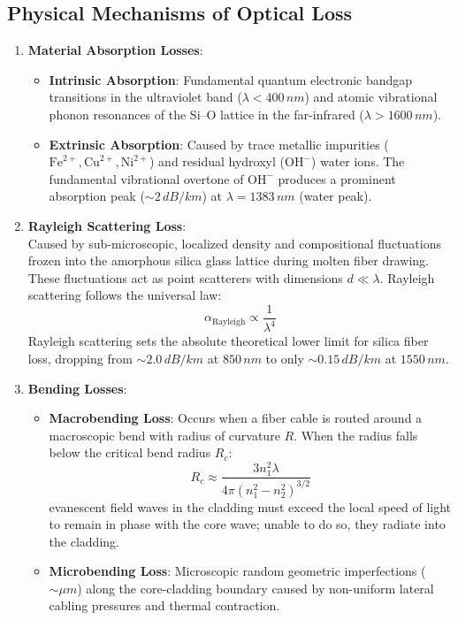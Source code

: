 \subsection{Physical Mechanisms of Optical Loss}
\begin{enumerate}
    \item \textbf{Material Absorption Losses}:
    \begin{itemize}
        \item \textbf{Intrinsic Absorption}: Fundamental quantum electronic bandgap transitions in the ultraviolet band ($\lambda < 400\,\si{nm}$) and atomic vibrational phonon resonances of the $\text{Si}\text{--}\text{O}$ lattice in the far-infrared ($\lambda > 1600\,\si{nm}$).
        \item \textbf{Extrinsic Absorption}: Caused by trace metallic impurities ($\text{Fe}^{2+}, \text{Cu}^{2+}, \text{Ni}^{2+}$) and residual hydroxyl ($\text{OH}^-$) water ions. The fundamental vibrational overtone of $\text{OH}^-$ produces a prominent absorption peak ($\sim 2\,\si{dB/km}$) at $\lambda = 1383\,\si{nm}$ (water peak).
    \end{itemize}
    \item \textbf{Rayleigh Scattering Loss}:\\
    Caused by sub-microscopic, localized density and compositional fluctuations frozen into the amorphous silica glass lattice during molten fiber drawing. These fluctuations act as point scatterers with dimensions $d \ll \lambda$. Rayleigh scattering follows the universal law:
    \begin{equation}
        \alpha_{\text{Rayleigh}} \propto \frac{1}{\lambda^4}
    \end{equation}
    Rayleigh scattering sets the absolute theoretical lower limit for silica fiber loss, dropping from $\sim 2.0\,\si{dB/km}$ at $850\,\si{nm}$ to only $\sim 0.15\,\si{dB/km}$ at $1550\,\si{nm}$.
    \item \textbf{Bending Losses}:
    \begin{itemize}
        \item \textbf{Macrobending Loss}: Occurs when a fiber cable is routed around a macroscopic bend with radius of curvature $R$. When the radius falls below the critical bend radius $R_c$:
        \begin{equation}
            R_c \approx \frac{3 n_1^2 \lambda}{4\pi (n_1^2 - n_2^2)^{3/2}}
        \end{equation}
        evanescent field waves in the cladding must exceed the local speed of light to remain in phase with the core wave; unable to do so, they radiate into the cladding.
        \item \textbf{Microbending Loss}: Microscopic random geometric imperfections ($\sim \si{\mu m}$) along the core-cladding boundary caused by non-uniform lateral cabling pressures and thermal contraction.
    \end{itemize}
\end{enumerate}

